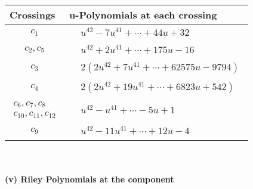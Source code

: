 \documentclass[1p]{elsarticle_modified}
\theoremstyle{definition}
\begin{document}
\begin{tabular}{m{50pt}|m{274pt}}
Crossings & \hspace{64pt}u-Polynomials at each crossing \\
\hline $$\begin{aligned}c_{1}\end{aligned}$$&$\begin{aligned}
&u^{42}-7 u^{41}+\cdots+44 u+32
\end{aligned}$\\
\hline $$\begin{aligned}c_{2},c_{5}\end{aligned}$$&$\begin{aligned}
&u^{42}+2 u^{41}+\cdots+175 u-16
\end{aligned}$\\
\hline $$\begin{aligned}c_{3}\end{aligned}$$&$\begin{aligned}
&2(2 u^{42}+7 u^{41}+\cdots+62575 u-9794)
\end{aligned}$\\
\hline $$\begin{aligned}c_{4}\end{aligned}$$&$\begin{aligned}
&2(2 u^{42}+19 u^{41}+\cdots+6823 u+542)
\end{aligned}$\\
\hline $$\begin{aligned}c_{6},c_{7},c_{8}\\c_{10},c_{11},c_{12}\end{aligned}$$&$\begin{aligned}
&u^{42}- u^{41}+\cdots-5 u+1
\end{aligned}$\\
\hline $$\begin{aligned}c_{9}\end{aligned}$$&$\begin{aligned}
&u^{42}-11 u^{41}+\cdots+12 u-4
\end{aligned}$\\
\hline
\end{tabular}\\~\\
\newpage\renewcommand{\arraystretch}{1}
\flushleft \textbf{(v) Riley Polynomials at the component}\newline \\
\end{document}
